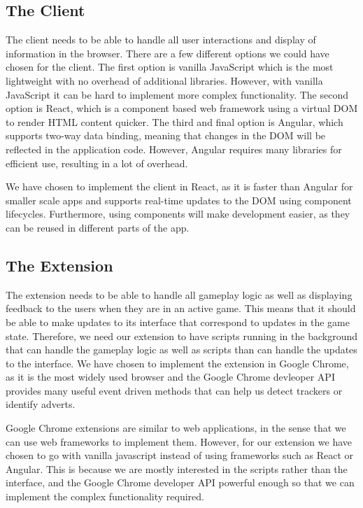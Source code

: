 \documentclass{l4proj}
\begin{document}
\subsection{The Client}
The client needs to be able to handle all user interactions and display of information in the browser. There are a few different options we could have chosen for the client. The first option is vanilla JavaScript which is the most lightweight
with no overhead of additional libraries. However, with vanilla JavaScript it can be hard to implement more complex functionality. The second option is React, which is a component based web framework using a virtual DOM to render HTML 
content quicker. The third and final option is Angular, which supports two-way data binding, meaning that changes in the DOM will be reflected in the application code. However, Angular requires many libraries for efficient use, resulting in a lot
of overhead.

We have chosen to implement the client in React, as it is faster than Angular for smaller scale apps and supports real-time updates to the DOM using component lifecycles. Furthermore, using components will make development easier, as they
can be reused in different parts of the app.

\subsection{The Extension}
The extension needs to be able to handle all gameplay logic as well as displaying feedback to the users when they are in an active game. This means that it should be able to make updates to its interface that correspond to updates in the game state.
Therefore, we need our extension to have scripts running in the background that can handle the gameplay logic as well as scripts than can handle the updates to the interface. We have chosen to implement the extension in Google Chrome, as it is the
most widely used browser and the Google Chrome devleoper API provides many useful event driven methods that can help us detect trackers or identify adverts.

Google Chrome extensions are similar to web applications, in the sense that we can use web frameworks to implement them. However, for our extension we have chosen to go with vanilla javascript instead of using frameworks such as React or Angular.
This is because we are mostly interested in the scripts rather than the interface, and the Google Chrome developer API powerful enough so that we can implement the complex functionality required.
\end{document}
